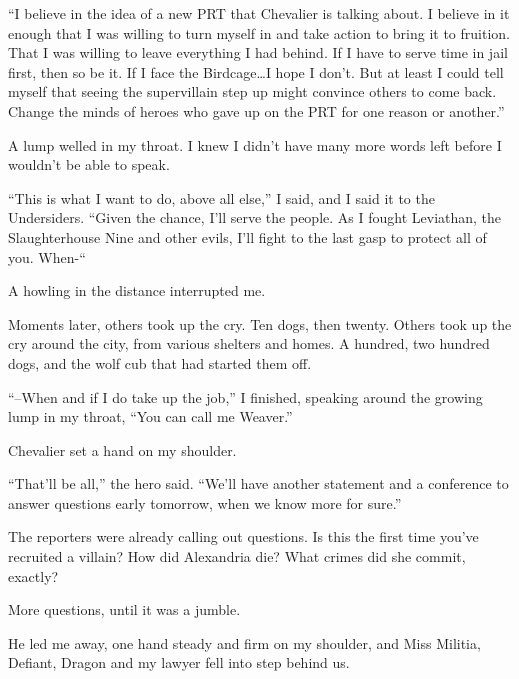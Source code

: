 ``I believe in the idea of a new PRT that Chevalier is talking about.  I believe in it enough that I was willing to turn myself in and take action to bring it to fruition.  That I was willing to leave everything I had behind.  If I have to serve time in jail first, then so be it.  If I face the Birdcage\ldots I hope I don't.  But at least I could tell myself that seeing the supervillain step up might convince others to come back.  Change the minds of heroes who gave up on the PRT for one reason or another.''



A lump welled in my throat.  I knew I didn't have many more words left before I wouldn't be able to speak.



``This is what I want to do, above all else,'' I said, and I said it to the Undersiders.  ``Given the chance, I'll serve the people.  As I fought Leviathan, the Slaughterhouse Nine and other evils, I'll fight to the last gasp to protect all of you.  When-``



A howling in the distance interrupted me.



Moments later, others took up the cry.  Ten dogs, then twenty.  Others took up the cry around the city, from various shelters and homes.  A hundred, two hundred dogs, and the wolf cub that had started them off.



``--When and if I do take up the job,'' I finished, speaking around the growing lump in my throat, ``You can call me Weaver.''



Chevalier set a hand on my shoulder.



``That'll be all,'' the hero said.  ``We'll have another statement and a conference to answer questions early tomorrow, when we know more for sure.''



The reporters were already calling out questions.  Is this the first time you've recruited a villain?  How did Alexandria die?  What crimes did she commit, exactly?



More questions, until it was a jumble.



He led me away, one hand steady and firm on my shoulder, and Miss Militia, Defiant, Dragon and my lawyer fell into step behind us.



